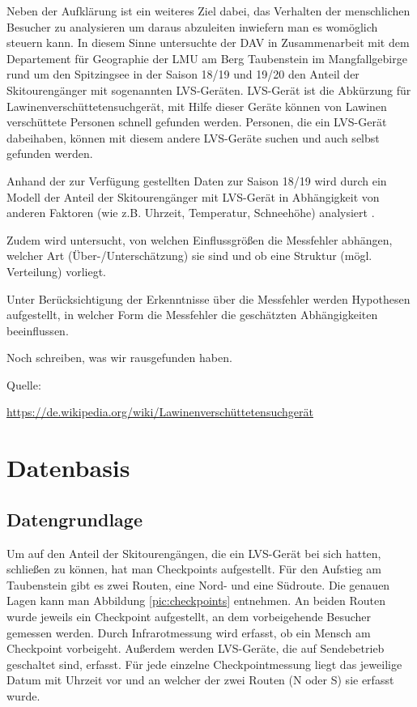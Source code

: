 \documentclass[12pt]{scrreprt}
\begin{document}
	
	
	Neben der Aufklärung ist ein weiteres Ziel dabei, das Verhalten der menschlichen Besucher zu analysieren um daraus abzuleiten inwiefern man es womöglich steuern kann. In diesem Sinne untersuchte der DAV in Zusammenarbeit mit dem Departement für Geographie der LMU am Berg Taubenstein im Mangfallgebirge rund um den Spitzingsee in der Saison 18/19 und 19/20 den Anteil der Skitourengänger mit sogenannten LVS-Geräten. LVS-Gerät ist die Abkürzung für Lawinenverschüttetensuchgerät, mit Hilfe dieser Geräte können von Lawinen verschüttete Personen schnell gefunden werden. Personen, die ein LVS-Gerät dabeihaben, können mit diesem andere LVS-Geräte suchen und auch selbst gefunden werden.
	
	
	
	Anhand der zur Verfügung gestellten Daten zur Saison 18/19 wird durch ein Modell der Anteil der Skitourengänger mit LVS-Gerät in Abhängigkeit von anderen Faktoren (wie z.B. Uhrzeit, Temperatur, Schneehöhe) analysiert .
	
	Zudem wird untersucht, von welchen Einflussgrößen die Messfehler abhängen, welcher Art (Über-/Unterschätzung) sie sind und ob eine Struktur (mögl. Verteilung) vorliegt.
	
	Unter Berücksichtigung der Erkenntnisse über die Messfehler werden Hypothesen aufgestellt, in welcher Form die Messfehler die geschätzten Abhängigkeiten beeinflussen.
	
	
	
	Noch schreiben, was wir rausgefunden haben.
	
	
	
	Quelle:
	
	\url{https://de.wikipedia.org/wiki/Lawinenverschüttetensuchgerät}
	
	
	
	\chapter{Datenbasis}
	
	\section{Datengrundlage}
	
	Um auf den Anteil der Skitourengängen, die ein LVS-Gerät bei sich hatten, schließen zu können, hat man Checkpoints aufgestellt. Für den Aufstieg am Taubenstein gibt es zwei Routen, eine Nord- und eine Südroute. Die genauen Lagen kann man Abbildung \ref{pic:checkpoints} entnehmen. An beiden Routen wurde jeweils ein Checkpoint aufgestellt, an dem vorbeigehende Besucher gemessen werden. Durch Infrarotmessung wird erfasst, ob ein Mensch am Checkpoint vorbeigeht. Außerdem werden LVS-Geräte, die auf Sendebetrieb geschaltet sind, erfasst. Für jede einzelne Checkpointmessung liegt das jeweilige Datum mit Uhrzeit vor und an welcher der zwei Routen (N oder S) sie erfasst wurde.
	
\end{document}
